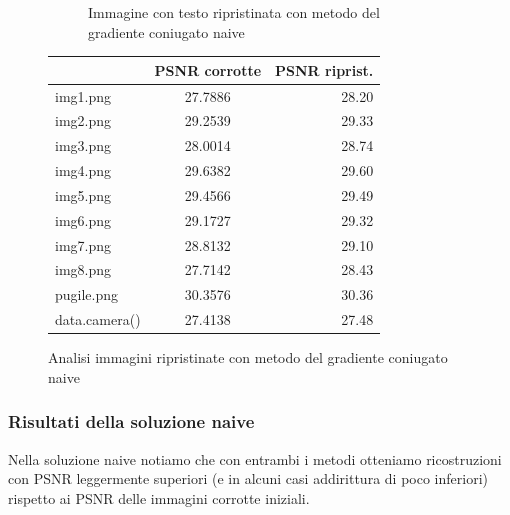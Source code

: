 \begin{figure}[H]
\begin{subfigure}{0.5\textwidth}
    \caption{Immagine con testo ripristinata con metodo del gradiente coniugato naive}
  \end{subfigure}
  \caption{Analisi immagini ripristinate con metodo del gradiente coniugato naive}
  \begin{minipage}{0.6\textwidth}\centering
    \begin{tabular}{|lcr|}
      \hline
      \rowcolor{orange}
      \multicolumn{1}{|c|}{\textbf{Immagine}} & \multicolumn{1}{l|}{\textbf{PSNR corrotte}} & \multicolumn{1}{c|}{\textbf{PSNR riprist.}}  \\ \hline
      img1.png          & 27.7886                      & 28.20                              \\
      img2.png          & 29.2539                      & 29.33                              \\
      img3.png          & 28.0014                      & 28.74                              \\
      img4.png          & 29.6382                      & 29.60                              \\
      img5.png          & 29.4566                      & 29.49                              \\
      img6.png          & 29.1727                      & 29.32                              \\
      img7.png          & 28.8132                      & 29.10                              \\
      img8.png          & 27.7142                      & 28.43                              \\ \hline
      pugile.png        & 30.3576                      & 30.36                              \\
      data.camera()     & 27.4138                      & 27.48                             \\ \hline
      \end{tabular}
  \end{minipage}
\end{figure}

{\color{oorange}\subsubsection{Risultati della soluzione naive}}
Nella soluzione naive notiamo che con entrambi i metodi otteniamo ricostruzioni con PSNR leggermente 
superiori (e in alcuni casi addirittura di poco inferiori) rispetto ai PSNR delle immagini corrotte iniziali.

